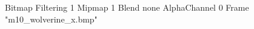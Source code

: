 {Bitmap
	{Filtering 1}
	{Mipmap 1}
	{Blend none}
	{AlphaChannel 0}
	{Frame "m10_wolverine_x.bmp"}
}
